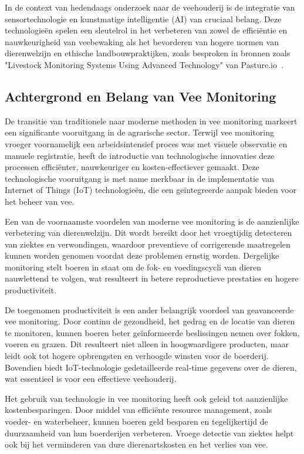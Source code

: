 In de context van hedendaags onderzoek naar de veehouderij is de integratie van sensortechnologie en kunstmatige intelligentie (AI) van cruciaal belang. 
Deze technologieën spelen een sleutelrol in het verbeteren van zowel de efficiëntie en nauwkeurigheid van veebewaking als het bevorderen van hogere normen van dierenwelzijn en ethische landbouwpraktijken, zoals besproken in bronnen zoals "Livestock Monitoring Systems Using Advanced Technology" van Pasture.io~\autocite{PastureIo}.
\subsection{Achtergrond en Belang van Vee Monitoring}
De transitie van traditionele naar moderne methoden in vee monitoring markeert een significante vooruitgang in de agrarische sector. Terwijl vee monitoring vroeger voornamelijk een arbeidsintensief proces was met visuele observatie en manuele registratie, heeft de introductie van technologische innovaties deze processen efficiënter, nauwkeuriger en kosten-effectiever gemaakt\autocite{ToAgriculture}. Deze technologische vooruitgang is met name merkbaar in de implementatie van Internet of Things (IoT) technologieën, die een geïntegreerde aanpak bieden voor het beheer van vee\autocite{IntuzIoT}.

Een van de voornaamste voordelen van moderne vee monitoring is de aanzienlijke verbetering van dierenwelzijn. Dit wordt bereikt door het vroegtijdig detecteren van ziektes en verwondingen, waardoor preventieve of corrigerende maatregelen kunnen worden genomen voordat deze problemen ernstig worden. Dergelijke monitoring stelt boeren in staat om de fok- en voedingscycli van dieren nauwlettend te volgen, wat resulteert in betere reproductieve prestaties en hogere productiviteit\autocite{ToAgriculture}.

De toegenomen productiviteit is een ander belangrijk voordeel van geavanceerde vee monitoring. Door continu de gezondheid, het gedrag en de locatie van dieren te monitoren, kunnen boeren beter geïnformeerde beslissingen nemen over fokken, voeren en grazen. Dit resulteert niet alleen in hoogwaardigere producten, maar leidt ook tot hogere opbrengsten en verhoogde winsten voor de boerderij\autocite{ToAgriculture}. Bovendien biedt IoT-technologie gedetailleerde real-time gegevens over de dieren, wat essentieel is voor een effectieve veehouderij\autocite{IntuzIoT}.

Het gebruik van technologie in vee monitoring heeft ook geleid tot aanzienlijke kostenbesparingen. Door middel van efficiënte resource management, zoals voeder- en waterbeheer, kunnen boeren geld besparen en tegelijkertijd de duurzaamheid van hun boerderijen verbeteren. Vroege detectie van ziektes helpt ook bij het verminderen van dure dierenartskosten en het verlies van vee\autocite{ToAgriculture}\autocite{IntuzIoT}.

